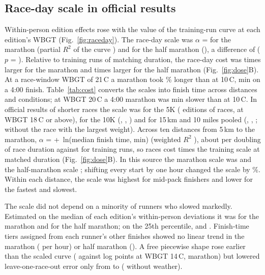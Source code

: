 \documentclass[12pt]{article}
\newcommand{\degC}{\,\textdegree C}
\begin{document}
\subsection{Race-day scale in official results}
Within-person edition effects rose with the value of the training-run curve at each edition's WBGT (Fig.~\ref{fig:raceday}). The race-day scale was $\alpha$ = \alphaMarCI{} for the marathon (partial $R^2$ of the curve \prsqMar) and \alphaHalfCI{} for the half marathon (\prsqHalf), a difference of \alphaDiff{} ($p$ = \alphaDiffP). Relative to training runs of matching duration, the race-day cost was \ratioMar{} times larger for the marathon and \ratioHalf{} times larger for the half marathon (Fig.~\ref{fig:dose}B). At a race-window WBGT of 21\degC{} a marathon took \marPctTwentyone\% longer than at 10\degC, \marMinTwentyone{} min on a 4:00 finish. Table~\ref{tab:cost} converts the scales into finish time across distances and conditions; at WBGT 20\degC{} a 4:00 marathon was \marMinTwenty{} min slower than at 10\degC. In official results of shorter races the scale was \alphaFiveK{} for the 5K (\nEdFiveK{} editions of \nCrFiveK{} races, \nWarmFiveK{} at WBGT 18\degC{} or above), \alphaTenK{} for the 10K (\nEdTenK{}, \nCrTenK{}, \nWarmTenK) and \alphaFifteen{} for 15\,km and 10 miles pooled (\nEdFifteen{}, \nCrFifteen{}, \nWarmFifteen; \alphaFifteenNoBoiler{} without the race with the largest weight). Across ten distances from 5\,km to the marathon, $\alpha$ = \durIntercept{} + \durSlope{}\,ln(median finish time, min) (weighted $R^2$ \durRsq), about \durPerDoubling{} per doubling of race duration against \trainPerDoubling{} for training runs, so races cost \raceOverTrainRange{} times the training scale at matched duration (Fig.~\ref{fig:dose}B). In this source the marathon scale was \rsuMar{} and the half-marathon scale \rsuHalf{}; shifting every start by one hour changed the scale by \startShift\%. Within each distance, the scale was highest for mid-pack finishers and lower for the fastest and slowest.

The scale did not depend on a minority of runners who slowed markedly. Estimated on the median of each edition's within-person deviations it was \alphaMarMedian{} for the marathon and \alphaHalfMedian{} for the half marathon; on the 25th percentile, \alphaMarQtf{} and \alphaHalfQtf. Finish-time tiers assigned from each runner's other finishes showed no linear trend in the marathon (\tierMarTrend{} per hour) or half marathon (\tierHalfTrend). A free piecewise shape rose earlier than the scaled curve (\freeFourteen{} against \scaledFourteen{} log points at WBGT 14\degC, marathon) but lowered leave-one-race-out error only from \rmseScaled{} to \rmseFree{} (\rmseNoWx{} without weather).
\end{document}
